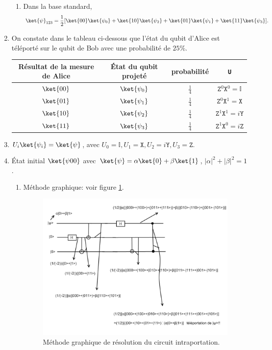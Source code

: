 \begin{enumerate}
\begin{enumerate}
\item Dans la base standard,
\begin{equation}
\ket{\psi}_{123}=\frac{1}{2}[\ket{00}\ket{\psi_0}+\ket{10}\ket{\psi_2}+\ket{
01}\ket{\psi_1}+\ket{11}\ket{\psi_3}].
\end{equation}
\end{enumerate}
\item On constate dans le tableau ci-dessous que l'état du qubit d'Alice est
téléporté sur le qubit de Bob avec une probabilité de $25\%$.
\begin{center}
\begin{tabular}
[c]{|c|c|c|c|}\hline\hline
\rowcolor[gray]{0.8}\textbf{Résultat de la mesure de Alice} & \textbf{État
du qubit projeté} & \textbf{probabilité} & \texttt{U}\\\hline\hline
$\ket{00}$ & $\ket{\psi_0}$ & $\frac{1}{4}$ & 
$\mathtt{Z}^0\mathtt{X}^0=\mathbb{I}$\\\hline
$\ket{01}$ & $\ket{\psi_1}$ & $\frac{1}{4}$ & 
$\mathtt{Z}^0\mathtt{X}^1=\mathtt{X}$\\\hline
$\ket{10}$ & $\ket{\psi_2}$ & $\frac{1}{4}$ & 
$\mathtt{Z}^1\mathtt{X}^1=i\mathtt{Y}$\\\hline
$\ket{11}$ & $\ket{\psi_3}$ & $\frac{1}{4}$ & 
$\mathtt{Z}^1\mathtt{X}^0=i\mathtt{Z}$\\\hline
\end{tabular}
\end{center}

\item $U_{i}\ket{\psi_{i}}=\ket{\psi}$, avec
$U_0=\mathbb{I},U_1=\mathtt{X},U_2=i\mathtt{Y},U_3=\mathtt{Z}$.

\item État initial $\ket{\psi00}$ avec $\ket{\psi}=\alpha\ket{0} +\beta\ket{1}$,
$|\alpha|^{2}+|\beta|^{2}=1$.

\begin{enumerate}
	\item Méthode graphique: voir figure \ref{fig:methode1}.
\begin{figure}[hptb]
\centering
\includegraphics[scale=.6]{graphics/Interpolation_Sol.pdf}%
\caption{Méthode graphique de résolution du circuit intraportation.}%
\label{fig:methode1}%
\end{figure}


\end{enumerate}
\end{enumerate}
